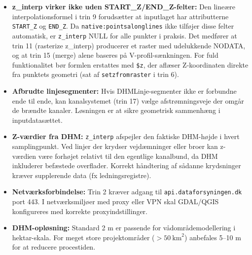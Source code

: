 \begin{itemize}
  \item \textbf{z\_interp virker ikke uden START\_Z/END\_Z-felter:}
        Den lineære interpolationsformel i trin 9 forudsætter at inputlaget
        har attributterne \texttt{START\_Z} og \texttt{END\_Z}. Da
        \texttt{native:pointsalonglines} ikke tilføjer disse felter automatisk,
        er \texttt{z\_interp} NULL for alle punkter i praksis. Det medfører at
        trin 11 (rasterize z\_interp) producerer et raster med udelukkende
        NODATA, og at trin 15 (merge) alene baseres på V-profil-sænkningen.
        For fuld funktionalitet bør formlen erstattes med \texttt{\$z}, der
        aflæser Z-koordinaten direkte fra punktets geometri (sat af
        \texttt{setzfromraster} i trin 6).

  \item \textbf{Afbrudte linjesegmenter:} Hvis DHMLinje-segmenter ikke er
        forbundne ende til ende, kan kanalsystemet (trin 17) vælge
        afstrømningsveje der omgår de brændte kanaler. Løsningen er at sikre
        geometrisk sammenhæng i inputdatasættet.

  \item \textbf{Z-værdier fra DHM:} \texttt{z\_interp} afspejler den faktiske
        DHM-højde i hvert samplingpunkt. Ved linjer der krydser vejdæmninger
        eller broer kan z-værdien være forhøjet relativt til den egentlige
        kanalbund, da DHM inkluderer befæstede overflader. Korrekt håndtering
        af sådanne krydsninger kræver supplerende data (fx ledningsregistre).

  \item \textbf{Netværksforbindelse:} Trin 2 kræver adgang til
        \texttt{api.dataforsyningen.dk} port 443. I netværksmiljøer med
        proxy eller VPN skal GDAL/QGIS konfigureres med korrekte
        proxyindstillinger.

  \item \textbf{DHM-opløsning:} Standard 2 m er passende for
        vådområdemodellering i hektar-skala. For meget store projektområder
        ($>50~\text{km}^2$) anbefales 5–10 m for at reducere procestiden.
\end{itemize}
